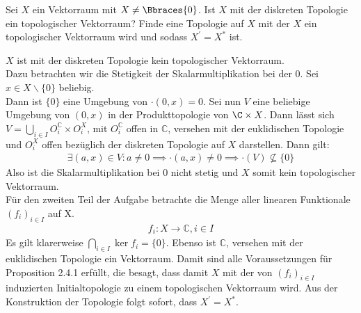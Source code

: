 \begin{exercise}

Sei $X$ ein Vektorraum mit $X \neq \Bbraces{0}$. Ist $X$ mit der diskreten Topologie ein topologischer Vektorraum?
Finde eine Topologie auf $X$ mit der $X$ ein topologischer Vektorraum wird und sodass $X^\prime = X^\ast$ ist.

\end{exercise}

\begin{solution}
$X$ ist mit der diskreten Topologie kein topologischer Vektorraum. \\
Dazu betrachten wir die Stetigkeit der Skalarmultiplikation bei der $0$.
Sei $x \in X\backslash\{0\}$ beliebig. \\
Dann ist $\{0\}$ eine Umgebung von $\cdot(0,x) = 0$.
Sei nun $V$ eine beliebige Umgebung von $(0,x)$ in der Produkttopologie von $\C \times X$.
Dann lässt sich $V = \bigcup_{i \in I}O_i^{\mathbb{C}}\times O_i^X$, mit
$O_i^{\mathbb{C}}$ offen in $\mathbb{C}$, versehen mit der euklidischen Topologie
und $O_i^X$ offen bezüglich der diskreten Topologie auf $X$ darstellen.
Dann gilt:
\begin{align*}
  \exists (a,x) \in V: a \neq 0 \implies \cdot(a,x) \neq 0 \implies \cdot(V) \nsubseteq \{0\}
\end{align*}
Also ist die Skalarmultiplikation bei 0 nicht stetig und $X$ somit kein topologischer
Vektorraum.
\\
Für den zweiten Teil der Aufgabe betrachte die Menge aller linearen Funktionale $(f_i)_{i \in I}$ auf X.
\begin{align*}
  f_i: X \rightarrow \mathbb{C}, i \in I
\end{align*}
Es gilt klarerweise $\bigcap_{i\in I}\ker f_i = \{0\}$.
Ebenso ist $\mathbb{C}$, versehen mit der euklidischen Topologie ein Vektorraum.
Damit sind alle Voraussetzungen für Proposition 2.4.1 erfüllt, die besagt, dass
damit $X$ mit der von $(f_i)_{i\in I}$ induzierten Initialtopologie zu einem topologischen Vektorraum wird.
Aus der Konstruktion der Topologie folgt sofort, dass $X^\prime = X^\ast$.
\end{solution}
